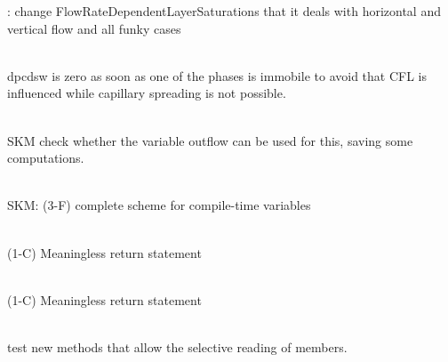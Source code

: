 \begin{DoxyRefList}
\label{todo__todo000232}%
%
\+: change Flow\+Rate\+Dependent\+Layer\+Saturations that it deals with horizontal and vertical flow and all funky cases 
\item[Member \doxylink{classcsmp_1_1_heterogeneity_and_rate_aware_model_ae8f09e847030ae2b543fbea9b18c003a}{csmp\+::Heterogeneity\+And\+Rate\+Aware\+Model\texorpdfstring{$<$}{<} dim \texorpdfstring{$>$}{>}\+::dpcds\+\_\+\+Phase} () const]\hfill \\
\label{todo__todo000229}%
%
dpcdsw is zero as soon as one of the phases is immobile to avoid that CFL is influenced while capillary spreading is not possible.  
\item[Member \doxylink{classcsmp_1_1_implicit_transport_ac8375bfa9bdbaff524a3b5c08f0033f9}{csmp\+::Implicit\+Transport\texorpdfstring{$<$}{<} dim \texorpdfstring{$>$}{>}\+::Outgoing\+Volumetric\+Flow} () const]\hfill \\
\label{todo__todo000093}%
%
SKM check whether the variable \textquotesingle{}outflow\textquotesingle{} can be used for this, saving some computations.  
\item[Struct \doxylink{structcsmp_1_1_index}{csmp\+::Index} ]\hfill \\
\label{todo__todo000010}%
%
SKM\+: (3-\/F) complete scheme for compile-\/time variables 
\item[Member \doxylink{structcsmp_1_1_index_a114a3c47f32b8334b27fa0f47651bb04}{csmp\+::Index\+::In} (std\+::fstream \&fp)]\hfill \\
\label{todo__todo000149}%
%
(1-\/C) Meaningless return statement  
\item[Member \doxylink{structcsmp_1_1_index_a2571e67408a6b2b271eac6a575a6f516}{csmp\+::Index\+::Out} (std\+::fstream \&fp) const]\hfill \\
\label{todo__todo000148}%
%
(1-\/C) Meaningless return statement  
\item[Class \doxylink{classcsmp_1_1_i_n_d_e_xand_variables___test}{csmp\+::INDEXand\+Variables\+\_\+\+Test} ]\hfill \\
\label{todo__todo000246}%
%
test new methods that allow the selective reading of  members. 
\item[Member \doxylink{classcsmp_1_1_i_n_d_e_xand_variables___test_ad1f8ff612a97670a133baa54d00e218b}{csmp\+::INDEXand\+Variables\+\_\+\+Test\+::run} ()]\hfill \\

\end{DoxyRefList}
